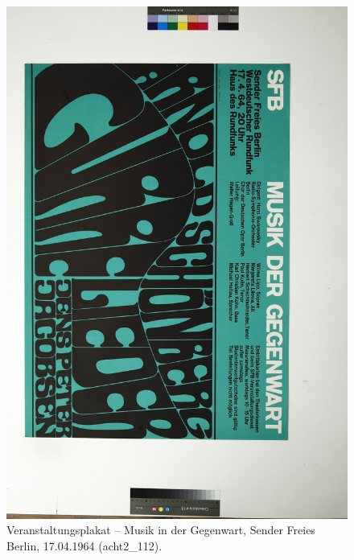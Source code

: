 \documentclass[a4paper,12pt,ngerman]{article}
\begin{document}
\newpage
\begin{landscape}
\begin{figure}[ht]
\includegraphics[height=0.85\linewidth, angle=90]{Abbildung_21_(acht2_112)}
\centering
\caption{Veranstaltungsplakat -- Musik in der Gegenwart, Sender Freies Berlin, 17.04.1964 (acht2\_112).}
\end{figure}
\end{landscape}
\end{document}
